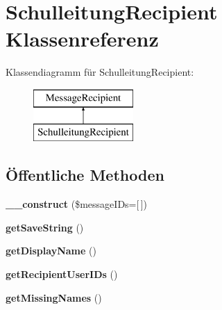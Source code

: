 \hypertarget{class_schulleitung_recipient}{}\section{Schulleitung\+Recipient Klassenreferenz}
\label{class_schulleitung_recipient}
Klassendiagramm für Schulleitung\+Recipient\+:\begin{figure}[H]
\begin{center}
\leavevmode
\includegraphics[height=2.000000cm]{class_schulleitung_recipient}
\end{center}
\end{figure}
\subsection*{Öffentliche Methoden}
\begin{DoxyCompactItemize}
\item 
\mbox{\label{class_schulleitung_recipient_ad663f3151ed37e9c4d12348052cc2fe4}} 
{\bfseries \+\_\+\+\_\+construct} (\$message\+I\+Ds=\mbox{[}$\,$\mbox{]})
\item 
\mbox{\label{class_schulleitung_recipient_a892408f0d804b0f5c9637746c71e9275}} 
{\bfseries get\+Save\+String} ()
\item 
\mbox{\label{class_schulleitung_recipient_a8f66fe8f5a136c6d9484fc41b60ef227}} 
{\bfseries get\+Display\+Name} ()
\item 
\mbox{\label{class_schulleitung_recipient_afc40b731ee4cabc72b7d4030a87db7ab}} 
{\bfseries get\+Recipient\+User\+I\+Ds} ()
\item 
\mbox{\label{class_schulleitung_recipient_a68ded9acdf1cd79bf67933601ebd667d}} 
{\bfseries get\+Missing\+Names} ()
\end{DoxyCompactItemize}
